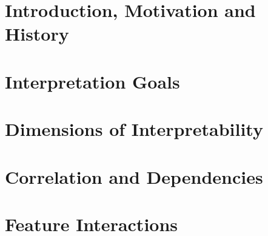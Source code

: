 \documentclass[11pt,compress,t,n
otes=noshow, aspectratio=169, xcolor=table]{beamer}
\newcommand{\pathiml}{../}
\begin{document}


%
\section{Introduction, Motivation and History}


\section{Interpretation Goals}


\section{Dimensions of Interpretability}


\section{Correlation and Dependencies}


\section{Feature Interactions}


% 
%
% 
\end{document}
